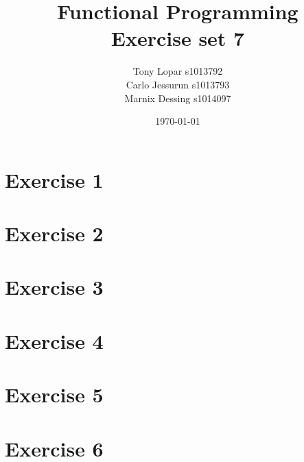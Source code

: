 \documentclass{article}
\begin{document}
\title{Functional Programming \\ Exercise set 7}
\date{\today}
\author{Tony Lopar s1013792 \\ Carlo Jessurun s1013793 \\ Marnix Dessing s1014097}
\maketitle

\section*{Exercise 1}

\section*{Exercise 2}
%
%
%
%
%
%
%
%

\section*{Exercise 3}
\section*{Exercise 4}
%
%
%
%
\section*{Exercise 5}
\section*{Exercise 6}
\end{document}
